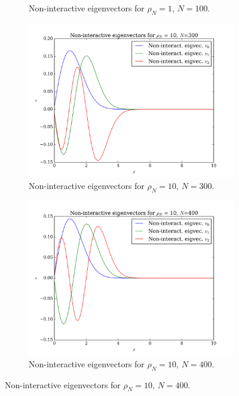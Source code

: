 \documentclass[11pt,a4paper,notitlepage]{article}
\begin{document}
\begin{figure}[H]
\begin{subfigure}[t]{0.45\textwidth}
		\caption{Non-interactive eigenvectors for $\rho_N = 1$, $N = 100$.}\label{fig:eigvecs-non-interact-1-100}
	\end{subfigure}
	\begin{subfigure}[b]{0.45\textwidth}
		\includegraphics[scale=0.40]{../non_interacting_eigvec_plot_rhoN=10_N=300.png}
		\caption{Non-interactive eigenvectors for $\rho_N = 10$, $N = 300$.}\label{fig:eigvecs-non-interact-10-300}
	\end{subfigure}
	\hfill
	\begin{subfigure}[b]{0.45\textwidth}
		\includegraphics[scale=0.40]{../non_interacting_eigvec_plot_rhoN=10_N=400.png}
		\caption{Non-interactive eigenvectors for $\rho_N = 10$, $N = 400$.}\label{fig:eigvecs-non-interact-10-400}

\end{subfigure}
\end{figure}
\end{document}
